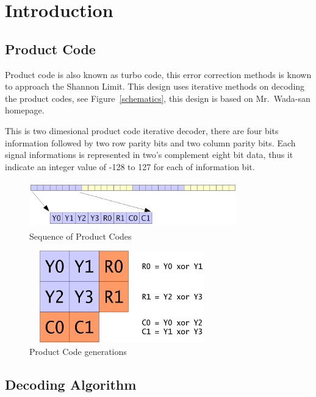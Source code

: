 \documentclass[a4paper,12pt]{report}
\begin{document}
\chapter{Introduction}

\vspace{2cm}
\section{Product Code}

Product code is also known as turbo code, this error correction methods
is known to approach the Shannon Limit. This design uses iterative
methods on decoding the product codes, see Figure~\ref{schematics}, this
design is based on Mr.~Wada-san homepage\cite{wada}.

This is two dimesional product code iterative decoder, there are four
bits information followed by two row parity bits and two column parity
bits.  Each signal informations is represented in two's complement eight
bit data, thus it indicate an integer value of -128 to 127 for each of
information bit.

\vspace{1cm}
\begin{figure}[H]
\center
\includegraphics[width=9cm,height=2cm]{sequence.eps}
\caption{Sequence of Product Codes}
\label{sequence}
\end{figure}

\begin{figure}[H]
\center
\includegraphics[width=8cm,height=4cm]{product_codes_table.eps}
\caption{Product Code generations}
\label{product_code}
\end{figure}

\section{Decoding Algorithm}
\end{document}

